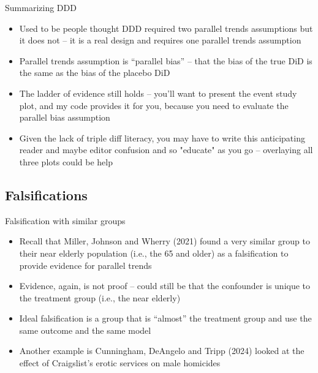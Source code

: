 \documentclass{beamer}
\begin{document}
\begin{frame}{Summarizing DDD}

\begin{itemize}
\item Used to be people thought DDD required two parallel trends assumptions but it does not -- it is a real design and requires one parallel trends assumption
\item Parallel trends assumption is ``parallel bias'' -- that the bias of the true DiD is the same as the bias of the placebo DiD
\item The ladder of evidence still holds -- you'll want to present the event study plot, and my code provides it for you, because you need to evaluate the parallel bias assumption
\item Given the lack of triple diff literacy, you may have to write this anticipating reader and maybe editor confusion and so "educate" as you go -- overlaying all three plots could be help

\end{itemize}

\end{frame}


\subsection{Falsifications}

\begin{frame}{Falsification with similar groups}

\begin{itemize}

	
	\item Recall that Miller, Johnson and Wherry (2021) found a very similar group to their near elderly population (i.e., the 65 and older)  as a falsification to provide evidence for parallel trends
	\item Evidence, again, is not proof -- could still be that the confounder is unique to the treatment group (i.e., the near elderly)
	\item Ideal falsification is a group that is ``almost'' the treatment group and use the same outcome and the same model
	\item Another example is Cunningham, DeAngelo and Tripp (2024) looked at the effect of Craigslist's erotic services on male homicides
\end{itemize}
\end{frame}
\end{document}
